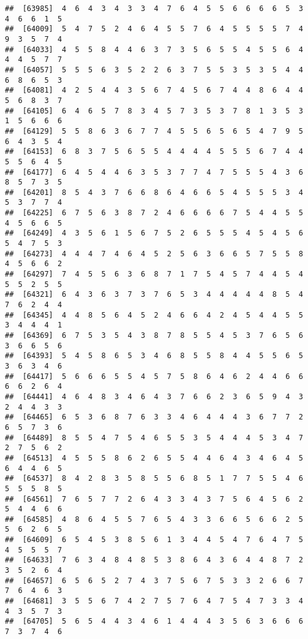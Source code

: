 \documentclass[
]{book}
\begin{document}
\begin{verbatim}
##  [63985]  4  6  4  3  4  3  3  4  7  6  4  5  5  6  6  6  6  5  3  4  6  6  1  5
##  [64009]  5  4  7  5  2  4  6  4  5  5  7  6  4  5  5  5  5  7  4  9  3  5  7  4
##  [64033]  4  5  5  8  4  4  6  3  7  3  5  6  5  5  4  5  5  6  4  4  4  5  7  7
##  [64057]  5  5  5  6  3  5  2  2  6  3  7  5  5  3  5  3  5  4  4  6  8  6  5  3
##  [64081]  4  2  5  4  4  3  5  6  7  4  5  6  7  4  4  8  6  4  4  5  6  8  3  7
##  [64105]  6  4  6  5  7  8  3  4  5  7  3  5  3  7  8  1  3  5  3  1  5  6  6  6
##  [64129]  5  5  8  6  3  6  7  7  4  5  5  6  5  6  5  4  7  9  5  6  4  3  5  4
##  [64153]  6  8  3  7  5  6  5  5  4  4  4  4  5  5  5  6  7  4  4  5  5  6  4  5
##  [64177]  6  4  5  4  4  6  3  5  3  7  7  4  7  5  5  5  4  3  6  8  5  7  3  5
##  [64201]  8  5  4  3  7  6  6  8  6  4  6  6  5  4  5  5  5  3  4  5  3  7  7  4
##  [64225]  6  7  5  6  3  8  7  2  4  6  6  6  6  7  5  4  4  5  5  4  5  6  6  5
##  [64249]  4  3  5  6  1  5  6  7  5  2  6  5  5  5  4  5  4  5  6  5  4  7  5  3
##  [64273]  4  4  4  7  4  6  4  5  2  5  6  3  6  6  5  7  5  5  8  4  5  6  6  2
##  [64297]  7  4  5  5  6  3  6  8  7  1  7  5  4  5  7  4  4  5  4  5  5  2  5  5
##  [64321]  6  4  3  6  3  7  3  7  6  5  3  4  4  4  4  4  8  5  4  7  6  2  4  4
##  [64345]  4  4  8  5  6  4  5  2  4  6  6  4  2  4  5  4  4  5  5  3  4  4  4  1
##  [64369]  6  7  5  3  5  4  3  8  7  8  5  5  4  5  3  7  6  5  6  3  6  6  5  6
##  [64393]  5  4  5  8  6  5  3  4  6  8  5  5  8  4  4  5  5  6  5  3  6  3  4  6
##  [64417]  5  6  6  6  5  5  4  5  7  5  8  6  4  6  2  4  4  6  6  6  6  2  6  4
##  [64441]  4  6  4  8  3  4  6  4  3  7  6  6  2  3  6  5  9  4  3  2  4  4  3  3
##  [64465]  6  5  3  6  8  7  6  3  3  4  6  4  4  4  3  6  7  7  2  6  5  7  3  6
##  [64489]  8  5  5  4  7  5  4  6  5  5  3  5  4  4  4  5  3  4  7  2  7  5  6  2
##  [64513]  4  5  5  5  8  6  2  6  5  5  4  4  6  4  3  4  6  4  5  6  4  4  6  5
##  [64537]  8  4  2  8  3  5  8  5  5  6  8  5  1  7  7  5  5  4  6  5  5  5  8  5
##  [64561]  7  6  5  7  7  2  6  4  3  3  4  3  7  5  6  4  5  6  2  5  4  4  6  6
##  [64585]  4  8  6  4  5  5  7  6  5  4  3  3  6  6  5  6  6  2  5  5  6  2  6  5
##  [64609]  6  5  4  5  3  8  5  6  1  3  4  4  5  4  7  6  4  7  5  4  5  5  5  7
##  [64633]  7  6  3  4  8  4  8  5  3  8  6  4  3  6  4  4  8  7  2  3  5  2  6  4
##  [64657]  6  5  6  5  2  7  4  3  7  5  6  7  5  3  3  2  6  6  7  7  6  4  6  3
##  [64681]  3  5  5  6  7  4  2  7  5  7  6  4  7  5  4  7  3  3  4  4  3  5  7  3
##  [64705]  5  6  5  4  4  3  4  6  1  4  4  4  3  5  6  3  6  6  6  7  3  7  4  6

\end{verbatim}
\end{document}
